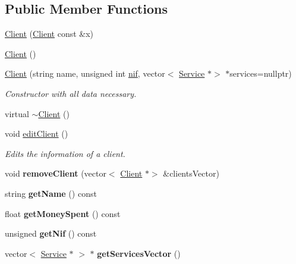 \subsection*{Public Member Functions}
\begin{DoxyCompactItemize}
\item 
\hyperlink{class_client_ab3079953a67493b5da6ffb32d4f14ac7}{Client} (\hyperlink{class_client}{Client} const \&x)
\item 
\hyperlink{class_client_ae51af7aa6b8f591496a8f6a4a87a14bf}{Client} ()
\item 
\hyperlink{class_client_a3cdfb856b1cccd81052f589c850ab86f}{Client} (string name, unsigned int \hyperlink{class_client_a1c94dc96a56cb5032573fb1d528517c2}{nif}, vector$<$ \hyperlink{class_service}{Service} $\ast$$>$ $\ast$services=nullptr)
\begin{DoxyCompactList}\small\item\em Constructor with all data necessary. \end{DoxyCompactList}\item 
virtual \hyperlink{class_client_a840e519ca781888cbd54181572ebe3a7}{$\sim$\+Client} ()
\item 
void \hyperlink{class_client_afe8b004559fd1480fb8747c352f167db}{edit\+Client} ()
\begin{DoxyCompactList}\small\item\em Edits the information of a client. \end{DoxyCompactList}\item 
\mbox{\label{class_client_a7f845c33f4aa7b7081ae72d9a16c2d3f}} 
void {\bfseries remove\+Client} (vector$<$ \hyperlink{class_client}{Client} $\ast$$>$ \&clients\+Vector)
\item 
\mbox{\label{class_client_a5c473ba52d7678744edec9e51052c947}} 
string {\bfseries get\+Name} () const
\item 
\mbox{\label{class_client_a226ff919591e7fdfa6c386e9aa5300a5}} 
float {\bfseries get\+Money\+Spent} () const
\item 
\mbox{\label{class_client_a35c9fed8cdb36d28fd5e51bd2aee852e}} 
unsigned {\bfseries get\+Nif} () const
\item 
\mbox{\label{class_client_a13ab3e2d37fde2de5b6a40d4523bb999}} 
vector$<$ \hyperlink{class_service}{Service} $\ast$ $>$ $\ast$ {\bfseries get\+Services\+Vector} ()

\end{DoxyCompactItemize}
